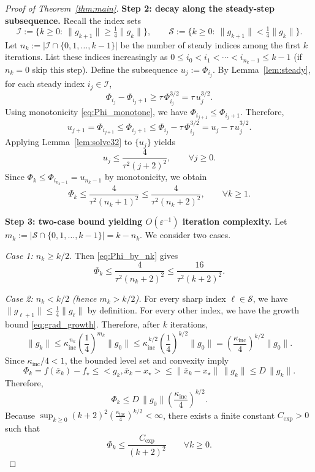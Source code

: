 \documentclass[11pt,a4paper]{article}
\def\cO{O}%
\def\ip#1#2{<#1,#2>}%
\newcommand{\ip}[2]{\left\langle #1,#2\right\rangle}
\newcommand{\cO}{\mathcal{O}}
\begin{document}
\begin{proof}[Proof of Theorem~\ref{thm:main}]
\smallskip
\noindent\textbf{Step 2: decay along the steady-step subsequence.}
Recall the index sets
\[
\mathcal I:=\{k\ge 0:\ \|g_{k+1}\|\ge \tfrac14\|g_k\|\},
\qquad
\mathcal S:=\{k\ge 0:\ \|g_{k+1}\|< \tfrac14\|g_k\|\}.
\]
Let $n_k:=|\mathcal I\cap\{0,1,\dots,k-1\}|$ be the number of steady indices among the first $k$ iterations.
List these indices increasingly as $0\le i_0<i_1<\cdots<i_{n_k-1}\le k-1$ (if $n_k=0$ skip this step).
Define the subsequence $u_j:=\Phi_{i_j}$.
By Lemma~\ref{lem:steady}, for each steady index $i_j\in\mathcal I$,
\[
\Phi_{i_j}-\Phi_{i_j+1}\ge \tau\,\Phi_{i_j}^{3/2}=\tau\,u_j^{3/2}.
\]
Using monotonicity \eqref{eq:Phi_monotone}, we have $\Phi_{i_{j+1}}\le \Phi_{i_j+1}$.
Therefore,
\[
u_{j+1}=\Phi_{i_{j+1}}
\le \Phi_{i_j+1}
\le \Phi_{i_j}-\tau\,\Phi_{i_j}^{3/2}
= u_j-\tau\,u_j^{3/2}.
\]
Applying Lemma~\ref{lem:solve32} to $\{u_j\}$ yields
\begin{equation}\label{eq:u_bound}
u_j\le \frac{4}{\tau^2(j+2)^2},\qquad \forall j\ge 0.
\end{equation}
Since $\Phi_k\le \Phi_{i_{n_k-1}}=u_{n_k-1}$ by monotonicity, we obtain
\begin{equation}\label{eq:Phi_by_nk}
\Phi_k\le \frac{4}{\tau^2(n_k+1)^2}\le \frac{4}{\tau^2(n_k+2)^2},
\qquad \forall k\ge 1.
\end{equation}

\smallskip
\noindent\textbf{Step 3: two-case bound yielding $\cO(\varepsilon^{-1})$ iteration complexity.}
Let $m_k:=|\mathcal S\cap\{0,1,\dots,k-1\}|=k-n_k$.
We consider two cases.

\emph{Case 1: $n_k\ge k/2$.}
Then \eqref{eq:Phi_by_nk} gives
\[
\Phi_k\le \frac{4}{\tau^2(n_k+2)^2}\le \frac{16}{\tau^2(k+2)^2}.
\]

\emph{Case 2: $n_k< k/2$ (hence $m_k>k/2$).}
For every sharp index $\ell\in\mathcal S$, we have $\|g_{\ell+1}\|\le \frac14\|g_\ell\|$ by definition.
For every other index, we have the growth bound \eqref{eq:grad_growth}.
Therefore, after $k$ iterations,
\[
\|g_k\|
\le \kappa_{\mathrm{inc}}^{\,n_k}\left(\frac14\right)^{m_k}\|g_0\|
\le \kappa_{\mathrm{inc}}^{\,k/2}\left(\frac14\right)^{k/2}\|g_0\|
=\left(\frac{\kappa_{\mathrm{inc}}}{4}\right)^{k/2}\|g_0\|.
\]
Since $\kappa_{\mathrm{inc}}/4<1$, the bounded level set and convexity imply
\[
\Phi_k=f(\bar x_k)-f_\star
\le \ip{g_k}{\bar x_k-x_\star}
\le \|\bar x_k-x_\star\|\,\|g_k\|
\le D\,\|g_k\|.
\]
Therefore,
\[
\Phi_k\le D\,\|g_0\|\left(\frac{\kappa_{\mathrm{inc}}}{4}\right)^{k/2}.
\]
Because $\sup_{k\ge 0}(k+2)^2\left(\frac{\kappa_{\mathrm{inc}}}{4}\right)^{k/2}<\infty$, there exists a finite constant $C_{\exp}>0$ such that
\[
\Phi_k\le \frac{C_{\exp}}{(k+2)^2}\qquad\forall k\ge 0.
\]


\end{proof}
\end{document}
